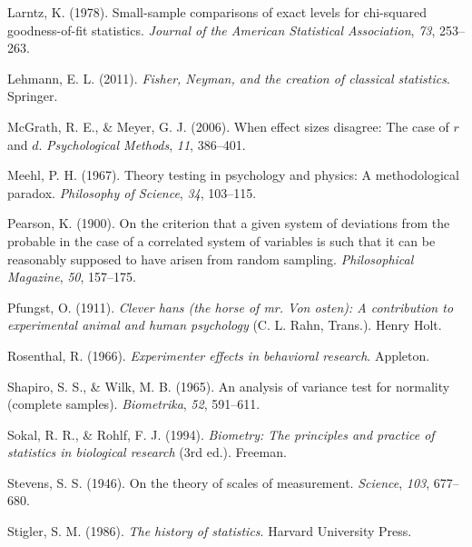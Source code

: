 \documentclass[
  a4paper,
]{book}
\newlength{\cslhangindent}
\newlength{\cslentryspacingunit} %
\newenvironment{CSLReferences}[2] %
 {%
  \setlength{\parindent}{0pt}
  \ifodd #1
  \let\oldpar\par
  \def\par{\hangindent=\cslhangindent\oldpar}
  \fi
  \setlength{\parskip}{#2\cslentryspacingunit}
 }%
 {}
\begin{document}
\begin{CSLReferences}{1}{0}
\leavevmode{}%
Larntz, K. (1978). Small-sample comparisons of exact levels for
chi-squared goodness-of-fit statistics. \emph{Journal of the American
Statistical Association}, \emph{73}, 253--263.

\leavevmode{}%
Lehmann, E. L. (2011). \emph{Fisher, {N}eyman, and the creation of
classical statistics}. Springer.

\leavevmode{}%
McGrath, R. E., \& Meyer, G. J. (2006). When effect sizes disagree: The
case of \(r\) and \(d\). \emph{Psychological Methods}, \emph{11},
386--401.

\leavevmode{}%
Meehl, P. H. (1967). Theory testing in psychology and physics: A
methodological paradox. \emph{Philosophy of Science}, \emph{34},
103--115.

\leavevmode{}%
Pearson, K. (1900). On the criterion that a given system of deviations
from the probable in the case of a correlated system of variables is
such that it can be reasonably supposed to have arisen from random
sampling. \emph{Philosophical Magazine}, \emph{50}, 157--175.

\leavevmode{}%
Pfungst, O. (1911). \emph{Clever hans (the horse of mr. Von osten): A
contribution to experimental animal and human psychology} (C. L. Rahn,
Trans.). Henry Holt.

\leavevmode{}%
Rosenthal, R. (1966). \emph{Experimenter effects in behavioral
research}. Appleton.

\leavevmode{}%
Shapiro, S. S., \& Wilk, M. B. (1965). An analysis of variance test for
normality (complete samples). \emph{Biometrika}, \emph{52}, 591--611.

\leavevmode{}%
Sokal, R. R., \& Rohlf, F. J. (1994). \emph{Biometry: The principles and
practice of statistics in biological research} (3rd ed.). Freeman.

\leavevmode{}%
Stevens, S. S. (1946). On the theory of scales of measurement.
\emph{Science}, \emph{103}, 677--680.

\leavevmode{}%
Stigler, S. M. (1986). \emph{The history of statistics}. Harvard
University Press.


\end{CSLReferences}
\end{document}
